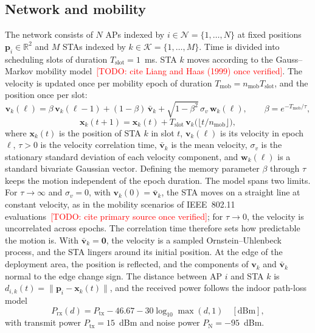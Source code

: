 \documentclass{ieeeaccess}
\newcommand{\todo}[1]{\textcolor{red}{[TODO: #1]}}
\begin{document}
\subsection{Network and mobility}
The network consists of $N$ APs indexed by $i \in \mathcal{N} = \{1,\dots,N\}$ at fixed positions $\mathbf{p}_i \in \mathbb{R}^2$ and $M$ STAs indexed by $k \in \mathcal{K} = \{1,\dots,M\}$. Time is divided into scheduling slots of duration $T_{\text{slot}} = 1$~ms. STA $k$ moves according to the Gauss--Markov mobility model~\todo{cite Liang and Haas (1999) once verified}. The velocity is updated once per mobility epoch of duration $T_{\text{mob}} = n_{\text{mob}} T_{\text{slot}}$, and the position once per slot:
\begin{equation}
\mathbf{v}_k(\ell) = \beta\,\mathbf{v}_k(\ell-1) + (1-\beta)\,\bar{\mathbf{v}}_k + \sqrt{1-\beta^2}\,\sigma_v\,\mathbf{w}_k(\ell), \qquad \beta = e^{-T_{\text{mob}}/\tau},
\label{eq:velocity}
\end{equation}
\begin{equation}
\mathbf{x}_k(t+1) = \mathbf{x}_k(t) + T_{\text{slot}}\,\mathbf{v}_k\bigl(\lfloor t/n_{\text{mob}} \rfloor\bigr),
\label{eq:position}
\end{equation}
where $\mathbf{x}_k(t)$ is the position of STA $k$ in slot $t$, $\mathbf{v}_k(\ell)$ is its velocity in epoch $\ell$, $\tau > 0$ is the velocity correlation time, $\bar{\mathbf{v}}_k$ is the mean velocity, $\sigma_v$ is the stationary standard deviation of each velocity component, and $\mathbf{w}_k(\ell)$ is a standard bivariate Gaussian vector. Defining the memory parameter $\beta$ through $\tau$ keeps the motion independent of the epoch duration. The model spans two limits. For $\tau \to \infty$ and $\sigma_v = 0$, with $\mathbf{v}_k(0) = \bar{\mathbf{v}}_k$, the STA moves on a straight line at constant velocity, as in the mobility scenarios of IEEE~802.11 evaluations~\todo{cite primary source once verified}; for $\tau \to 0$, the velocity is uncorrelated across epochs. The correlation time therefore sets how predictable the motion is. With $\bar{\mathbf{v}}_k = \mathbf{0}$, the velocity is a sampled Ornstein--Uhlenbeck process, and the STA lingers around its initial position. At the edge of the deployment area, the position is reflected, and the components of $\mathbf{v}_k$ and $\bar{\mathbf{v}}_k$ normal to the edge change sign. The distance between AP $i$ and STA $k$ is $d_{i,k}(t) = \|\mathbf{p}_i - \mathbf{x}_k(t)\|$, and the received power follows the indoor path-loss model
\begin{equation}
P_{\text{rx}}(d) = P_{\text{tx}} - 46.67 - 30 \log_{10} \max(d, 1) \quad [\text{dBm}],
\label{eq:pathloss}
\end{equation}
with transmit power $P_{\text{tx}} = 15$~dBm and noise power $P_{\text{N}} = -95$~dBm.
\end{document}
